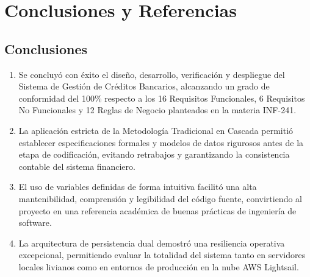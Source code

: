 \documentclass[11pt,letterpaper]{report}
\begin{document}
\chapter{Conclusiones y Referencias}

\section{Conclusiones}
\begin{enumerate}
    \item Se concluyó con éxito el diseño, desarrollo, verificación y despliegue del Sistema de Gestión de Créditos Bancarios, alcanzando un grado de conformidad del 100\% respecto a los 16 Requisitos Funcionales, 6 Requisitos No Funcionales y 12 Reglas de Negocio planteados en la materia INF-241.
    \item La aplicación estricta de la Metodología Tradicional en Cascada permitió establecer especificaciones formales y modelos de datos rigurosos antes de la etapa de codificación, evitando retrabajos y garantizando la consistencia contable del sistema financiero.
    \item El uso de variables definidas de forma intuitiva facilitó una alta mantenibilidad, comprensión y legibilidad del código fuente, convirtiendo al proyecto en una referencia académica de buenas prácticas de ingeniería de software.
    \item La arquitectura de persistencia dual demostró una resiliencia operativa excepcional, permitiendo evaluar la totalidad del sistema tanto en servidores locales livianos como en entornos de producción en la nube AWS Lightsail.
\end{enumerate}
\end{document}
